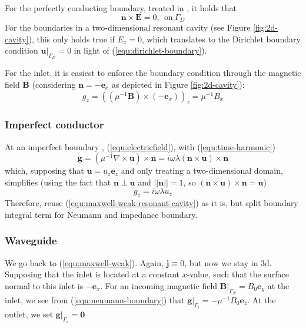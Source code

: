 \documentclass[11pt, a4paper]{article}
\begin{document}
For the perfectly conducting boundary, treated in \citep{monk}, it holds that
\begin{equation}
    \mathbf{n} \times \mathbf{E} = 0,~~\text{on}~\Gamma_D
\end{equation}
For the boundaries in a two-dimensional resonant cavity (see Figure 
\ref{fig:2d-cavity}), this only holds true if $E_z = 0$, which translates
to the Dirichlet boundary condition $\left.\mathbf{u}\right|_{\Gamma_D} = 0$
in light of (\ref{equ:dirichlet-boundary}).

For the inlet, it is easiest to enforce the boundary condition through the
magnetic field $\mathbf{B}$ (considering $\mathbf{n} = -\mathbf{e}_x$ as
depicted in Figure \ref{fig:2d-cavity}):
\begin{equation}
    g_z = (({\mu^{-1} \mathbf{B}}) \times (-\mathbf{e}_x))_z = \mu^{-1} B_x
\end{equation}

\subsubsection{Imperfect conductor}
\label{subsubsec:impedance}

At an imperfect boundary \cite{monk}, (\ref{equ:electricfield}), with (\ref{equ:time-harmonic})
\begin{equation}
    \mathbf{g} = (\mu^{-1} \nabla \times \mathbf{u}) \times \mathbf{n}
    = i \omega \lambda (\mathbf{n} \times \mathbf{u}) \times \mathbf{n}
\end{equation}
which, supposing that $\mathbf{u} = u_z \mathbf{e}_z$ and only treating a
two-dimensional domain, simplifies (using the fact that $\mathbf{n} \perp \mathbf{u}$
and $||\mathbf{n}|| = 1$, so $(\mathbf{n} \times \mathbf{u}) \times \mathbf{n} = \mathbf{u}$)
\begin{equation}
    g_z = i \omega \lambda u_z
\end{equation}
Therefore, reuse (\ref{equ:maxwell-weak-resonant-cavity}) as it is, but split 
boundary integral term for Neumann and impedance boundary.

\subsubsection{Waveguide}
\label{subsubsec:waveguide}

We go back to (\ref{equ:maxwell-weak}). Again, $\mathbf{j} \equiv 0$, but now 
we stay in 3d. Supposing that the inlet is located at a constant $x$-value,
such that the surface normal to this inlet is $-\mathbf{e}_x$. For an incoming
magnetic field $\left.\mathbf{B}\right|_{\Gamma_N} = B_0 \mathbf{e}_y$ at the
inlet, we see from (\ref{equ:neumann-boundary}) that $\left.\mathbf{g}\right|_{\Gamma_i}
= - \mu^{-1} B_0 \mathbf{e}_z$. At the outlet, we set $\left.\mathbf{g}\right|_{\Gamma_o} = \boldsymbol{0}$
\end{document}
